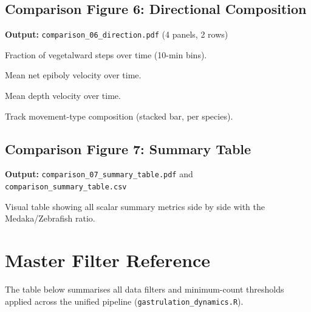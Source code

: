\documentclass[11pt,a4paper]{article}
\begin{document}
\subsection*{Comparison Figure 6: Directional Composition}

\noindent\textbf{Output:} \texttt{comparison\_06\_direction.pdf}
(4 panels, 2 rows)

\begin{description}[style=nextline,leftmargin=1.5cm]
  \item[6a] Fraction of vegetalward steps over time (10-min bins).
  \item[6b] Mean net epiboly velocity over time.
  \item[6c] Mean depth velocity over time.
  \item[6d] Track movement-type composition (stacked bar, per species).
\end{description}


\subsection*{Comparison Figure 7: Summary Table}

\noindent\textbf{Output:} \texttt{comparison\_07\_summary\_table.pdf} and
\texttt{comparison\_summary\_table.csv}

Visual table showing all scalar summary metrics side by side with the
Medaka/Zebrafish ratio.


\newpage
\section*{Master Filter Reference}

The table below summarises all data filters and minimum-count thresholds
applied across the unified pipeline (\texttt{gastrulation\_dynamics.R}).
\end{document}
